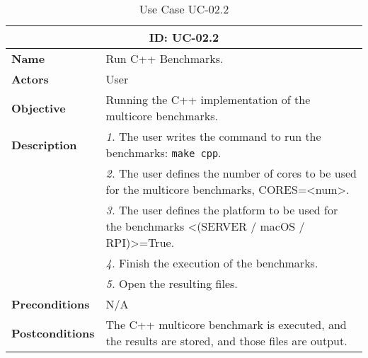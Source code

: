 \begin{table}[H]
    \centering
    \begin{tabular}{l p{10cm}}
        \toprule
        \multicolumn{2}{c}{\textbf{ID: UC-02.2}} \\
        \toprule
        \textbf{Name}                         &  Run C++ Benchmarks. \\
        \textbf{Actors}                       &  User \\
        \textbf{Objective}                    &  Running the C++ implementation of the multicore benchmarks. \\
        \multirow{1}{*}{\textbf{Description}} & \textsl{1.} The user writes the command to run the benchmarks: \texttt{make cpp}.\\
                                              & \textsl{2.} The user defines the number of cores to be used for the multicore benchmarks, CORES=<num>.\\
                                              & \textsl{3.} The user defines the platform to be used for the benchmarks <(SERVER / macOS / RPI)>=True.\\
                                              & \textsl{4.} Finish the execution of the benchmarks.\\
                                              & \textsl{5.} Open the resulting files.\\ 
        \textbf{Preconditions}                &  N/A \\
        \textbf{Postconditions}               &  The C++ multicore benchmark is executed, and the results are stored, and those files are output. \\
    \end{tabular}
    \caption{Use Case UC-02.2}
    \label{tab:uc-02.2}
\end{table}



